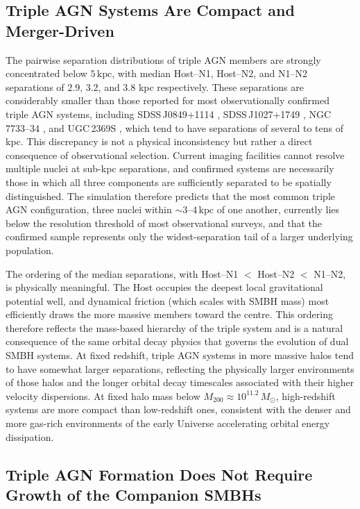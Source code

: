 \documentclass[twocolumn, 10pt]{article}
\begin{document}
\subsection*{Triple AGN Systems Are Compact and Merger-Driven}

The pairwise separation distributions of triple AGN members are
strongly concentrated below $5\,\mathrm{kpc}$, with median
Host--N1, Host--N2, and N1--N2 separations of 2.9, 3.2, and
3.8 kpc respectively. These separations are considerably
smaller than those reported for most observationally confirmed triple
AGN systems, including SDSS\,J0849+1114 \citep{Pfeifle2019},
SDSS\,J1027+1749 \citep{Liu2011}, NGC\,7733--34 \citep{Keshri2025},
and UGC\,2369S \citep{Ding2025}, which tend to have separations of
several to tens of kpc. This discrepancy is not a physical
inconsistency but rather a direct consequence of observational
selection. Current imaging facilities cannot resolve multiple nuclei
at sub-kpc separations, and confirmed systems are necessarily those
in which all three components are sufficiently separated to be
spatially distinguished. The simulation therefore predicts that the
most common triple AGN configuration, three nuclei within
$\sim 3$--$4\,\mathrm{kpc}$ of one another, currently lies below
the resolution threshold of most observational surveys, and that the
confirmed sample represents only the widest-separation tail of a
larger underlying population.

The ordering of the median separations, with Host--N1 $<$ Host--N2
$<$ N1--N2, is physically meaningful. The Host occupies the deepest
local gravitational potential well, and dynamical friction (which
scales with SMBH mass) most efficiently draws the more massive
members toward the centre. This ordering therefore reflects the
mass-based hierarchy of the triple system and is a natural consequence
of the same orbital decay physics that governs the evolution of dual
SMBH systems. At fixed redshift, triple AGN systems in more massive
halos tend to have somewhat larger separations, reflecting the
physically larger environments of those halos and the longer orbital
decay timescales associated with their higher velocity dispersions.
At fixed halo mass below $M_{200} \approx 10^{11.2}\,M_\odot$, high-redshift systems are more compact than
low-redshift ones, consistent with the denser and more gas-rich
environments of the early Universe accelerating orbital energy
dissipation.

\subsection*{Triple AGN Formation Does Not Require Growth of the
Companion SMBHs}
\end{document}

